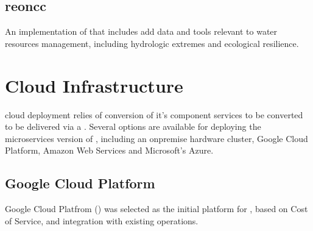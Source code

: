 \documentclass[letterpaper,12pt,english,openany,oneside]{sphinxmanual}
\begin{document}
\sphinxstepscope


\subsection{reoncc}
\label{\detokenize{euidev/development/_autosummary/reoncc:module-reoncc}}\label{\detokenize{euidev/development/_autosummary/reoncc:reoncc}}\label{\detokenize{euidev/development/_autosummary/reoncc::doc}}
\sphinxAtStartPar
An implementation of  that includes add data and tools relevant to water resources management, including hydrologic extremes and ecological resilience.

\sphinxstepscope


\section{Cloud Infrastructure}
\label{\detokenize{euidev/infrastructure/index:cloud-infrastructure}}\label{\detokenize{euidev/infrastructure/index::doc}}
\sphinxAtStartPar
{} cloud deployment relies of conversion of it’s component services to be converted to be delivered via a . Several options are available for deploying the microservices version of , including an on\sphinxhyphen{}premise hardware cluster, Google Cloud Platform, Amazon Web Services and Microsoft’s Azure.


\subsection{Google Cloud Platform}
\label{\detokenize{euidev/infrastructure/index:google-cloud-platform}}
\sphinxAtStartPar
Google Cloud Platfrom () was selected as the initial platform for , based on Cost of Service, and integration with existing  operations.
\end{document}
